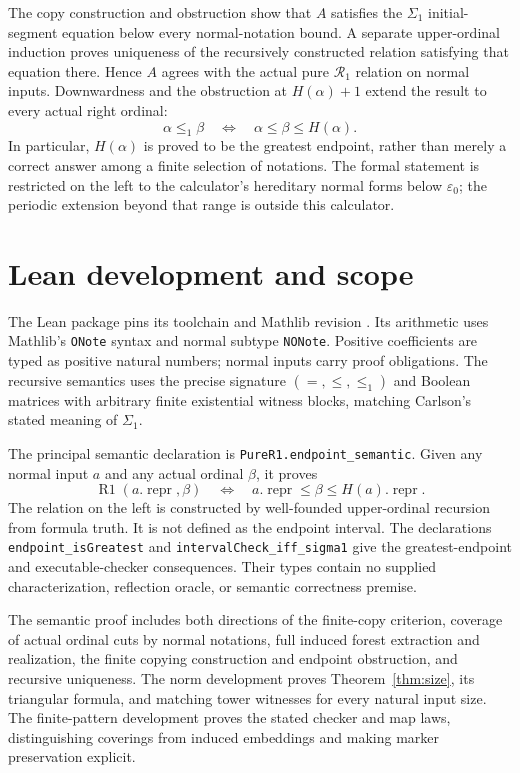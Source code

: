 \documentclass[11pt]{article}
\begin{document}
The copy construction and obstruction show that $A$ satisfies the
$\Sigma_1$ initial-segment equation below every normal-notation bound.
A separate upper-ordinal induction proves uniqueness of the recursively
constructed relation satisfying that equation there. Hence $A$ agrees
with the actual pure $\mathcal R_1$ relation on normal inputs.
Downwardness and the obstruction at $H(\alpha)+1$ extend the result to
every actual right ordinal:
\[
 \alpha\leq_1\beta
 \quad\Longleftrightarrow\quad
 \alpha\leq\beta\leq H(\alpha).
\]
In particular, $H(\alpha)$ is proved to be the greatest endpoint, rather
than merely a correct answer among a finite selection of notations.
The formal statement is restricted on the left to the calculator's
hereditary normal forms below $\varepsilon_0$; the periodic extension
beyond that range is outside this calculator.

\section{Lean development and scope}\label{sec:lean}

The Lean package pins its toolchain and Mathlib revision \cite{Mathlib}.
Its arithmetic uses Mathlib's \texttt{ONote} syntax and normal subtype
\texttt{NONote}. Positive coefficients are typed as positive natural
numbers; normal inputs carry proof obligations. The recursive semantics
uses the precise signature $(=,\leq,\leq_1)$ and Boolean matrices with
arbitrary finite existential witness blocks, matching Carlson's stated
meaning of $\Sigma_1$.

The principal semantic declaration is
\texttt{PureR1.endpoint\_semantic}. Given any normal input $a$ and
any actual ordinal $\beta$, it proves
\[
 \operatorname{R1}(a.\operatorname{repr},\beta)
 \quad\Longleftrightarrow\quad
 a.\operatorname{repr}\leq\beta\leq H(a).\operatorname{repr}.
\]
The relation on the left is constructed by well-founded upper-ordinal
recursion from formula truth. It is not defined as the endpoint interval.
The declarations \texttt{endpoint\_isGreatest} and
\texttt{intervalCheck\_iff\_sigma1} give the greatest-endpoint and
executable-checker consequences. Their types contain no supplied
characterization, reflection oracle, or semantic correctness premise.

The semantic proof includes both directions of the finite-copy criterion,
coverage of actual ordinal cuts by normal notations, full induced forest
extraction and realization, the finite copying construction and endpoint
obstruction, and recursive uniqueness. The norm development proves
Theorem~\ref{thm:size}, its triangular formula, and matching tower
witnesses for every natural input size. The finite-pattern development
proves the stated checker and map laws, distinguishing coverings from
induced embeddings and making marker preservation explicit.
\end{document}
